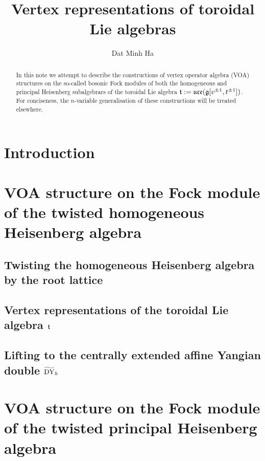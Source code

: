 

\setcounter{section}{-1}


\newcommand{\simpleroots}{\mathbb{I}}
\newcommand{\toroidal}{\t}
\newcommand{\Yangian}{\rmY}
\newcommand{\YangianDouble}{\rmD\rmY}
\newcommand{\extendedYangianDouble}{\widetilde{\rmD\rmY}}



    \title{Vertex representations of toroidal Lie algebras}
    
    \author{Dat Minh Ha}
    \maketitle
    
    \begin{abstract}
        In this note we attempt to describe the constructions of vertex operator algebra (VOA) structures on the so-called bosonic Fock modules of both the homogeneous and principal Heisenberg subalgebrars of the toroidal Lie algebra $\mathfrak{t} := \mathfrak{uce}(\mathfrak{g}[v^{\pm 1}, t^{\pm 1}])$. For conciseness, the $n$-variable generalisation of these constructions will be treated elsewhere. 
    \end{abstract}
    
    {
    \hypersetup{} 
    \tableofcontents %
    }

    \section{Introduction}

    \section{VOA structure on the Fock module of the twisted homogeneous Heisenberg algebra}
        \subsection{Twisting the homogeneous Heisenberg algebra by the root lattice}

        \subsection{Vertex representations of the toroidal Lie algebra \texorpdfstring{$\toroidal$}{}}

        \subsection{Lifting to the centrally extended affine Yangian double \texorpdfstring{$\extendedYangianDouble_{\hbar}$}{}}

    \section{VOA structure on the Fock module of the twisted principal Heisenberg algebra}
    
    \printbibliography

